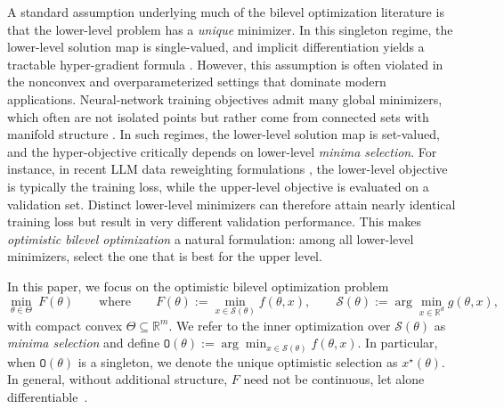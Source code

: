\documentclass{article}
\theoremstyle{normaltheorem}
\newcommand{\R}{\mathbb{R}}
\newcommand{\calS}{\mathcal{S}}
\newcommand{\selectedminimizerset}{{\texttt{O}}}
\begin{document}
A standard assumption underlying much of the bilevel optimization literature is that the lower-level problem has a \emph{unique} minimizer. In this singleton regime, the lower-level solution map is single-valued, and implicit differentiation yields a tractable hyper-gradient formula \citep{pedregosa2016hypergrad,franceschi2017forward,lorraine2020optimizing,huang2024optimal,liu2022bome,kwon2023penalty}. However, this assumption is often violated in the nonconvex and overparameterized settings that dominate modern applications. Neural-network training objectives admit many global minimizers, which often are not isolated points but rather come from connected sets with manifold structure \citep{draxler2018essentially,garipov2018loss,nguyen2019connected}. In such regimes, the lower-level solution map is set-valued, and the hyper-objective critically depends on lower-level \textit{minima selection}.
For instance, in recent LLM data reweighting formulations \citep{pan2025scalebio,shen2025seal}, the lower-level objective is typically the training loss, while the upper-level objective is evaluated on a validation set. Distinct lower-level minimizers can therefore attain nearly identical training loss but result in very different validation performance. This makes \emph{optimistic bilevel optimization} a natural formulation: among all lower-level minimizers, select the one that is best for the upper level.



 In this paper, we focus on the optimistic bilevel optimization problem  
\begin{equation}\label{eq:intro_blo}
\min_{\theta \in \Theta}\ F(\theta)
\qquad\text{where}\qquad
F(\theta):=\min_{x\in\calS(\theta)} f(\theta,x),
\qquad
\calS(\theta):=\arg\min_{x\in\R^d} g(\theta,x),
\end{equation}
with compact convex $\Theta \subseteq \R^m$. We refer to the inner optimization over $\calS(\theta)$ as \emph{minima selection} and define $\selectedminimizerset(\theta) := \arg\min_{x\in\calS(\theta)} f(\theta,x)$.
In particular, when $\selectedminimizerset(\theta)$ is a singleton, we denote the unique optimistic selection as $x^\star(\theta)$.
 In general, without additional structure, $F$ need not be continuous, let alone differentiable~\citep{dontchev2009implicit,arbel2022non}. 

 
\end{document}
